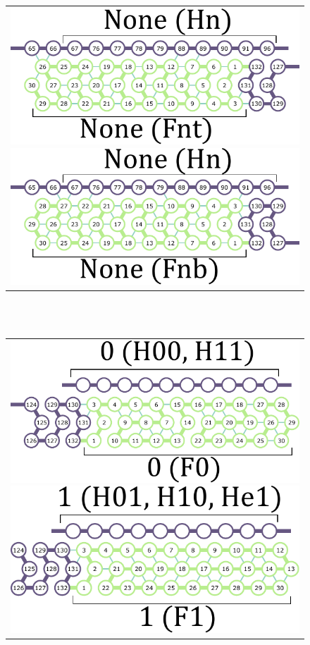 \documentclass[twocolumn]{svjour3}
\begin{document}
\begin{figure}[tb]
\begin{tabular}{c}
 \begin{minipage}{0.5\linewidth}
  \centering
   \includegraphics[width=0.7\linewidth]{fig/svg/Fnt_1.pdf}
 \end{minipage}
 
 \begin{minipage}{0.5\linewidth}
  \centering
   \includegraphics[width=0.7\linewidth]{fig/svg/Fnb_1.pdf}

 \end{minipage}
 \end{tabular}
\ \\
\ \\
\begin{tabular}{c}
 \begin{minipage}{0.5\linewidth}
  \centering
   \includegraphics[width=0.7\linewidth]{fig/svg/F0_1.pdf}
 \end{minipage}
 
 \begin{minipage}{0.5\linewidth}
  \centering
   \includegraphics[width=0.7\linewidth]{fig/svg/F1_1.pdf}


\end{minipage}
\end{tabular}
\end{figure}
\end{document}
